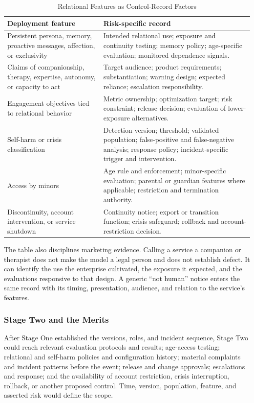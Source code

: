 \begin{table}[htbp]
\centering
\caption{Relational Features as Control-Record Factors}
\label{tab:relational-record}
\small
\begin{tabularx}{\textwidth}{>{\raggedright\arraybackslash}p{} X}
\toprule
Deployment feature & Risk-specific record \\
\midrule
Persistent persona, memory, proactive messages, affection, or exclusivity & Intended relational use; exposure and continuity testing; memory policy; age-specific evaluation; monitored dependence signals. \\
Claims of companionship, therapy, expertise, autonomy, or capacity to act & Target audience; product requirements; substantiation; warning design; expected reliance; escalation responsibility. \\
Engagement objectives tied to relational behavior & Metric ownership; optimization target; risk constraint; release decision; evaluation of lower-exposure alternatives. \\
Self-harm or crisis classification & Detection version; threshold; validated population; false-positive and false-negative analysis; response policy; incident-specific trigger and intervention. \\
Access by minors & Age rule and enforcement; minor-specific evaluation; parental or guardian features where applicable; restriction and termination authority. \\
Discontinuity, account intervention, or service shutdown & Continuity notice; export or transition function; crisis safeguard; rollback and account-restriction decision. \\
\bottomrule
\end{tabularx}
\end{table}

The table also disciplines marketing evidence. Calling a service a companion or therapist does not make the model a legal person and does not establish defect. It can identify the use the enterprise cultivated, the exposure it expected, and the evaluations responsive to that design. A generic ``not human'' notice enters the same record with its timing, presentation, audience, and relation to the service's features.

\subsubsection{Stage Two and the Merits}

After Stage One established the versions, roles, and incident sequence, Stage Two could reach relevant evaluation protocols and results; age-access testing; relational and self-harm policies and configuration history; material complaints and incident patterns before the event; release and change approvals; escalations and response; and the availability of account restriction, crisis interruption, rollback, or another proposed control. Time, version, population, feature, and asserted risk would define the scope.

